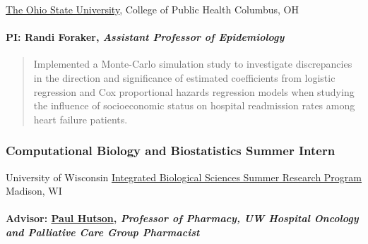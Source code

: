 \documentclass[
  fleqn, oneside]{article}
\begin{document}
\href{https://stat.osu.edu}{The Ohio State University}, College of
Public Health \newline Columbus, OH

\hypertarget{pi-randi-foraker-assistant-professor-of-epidemiology}{%
\paragraph{\texorpdfstring{PI: Randi Foraker, \emph{Assistant Professor
of
Epidemiology}}{PI: Randi Foraker, Assistant Professor of Epidemiology}}\label{pi-randi-foraker-assistant-professor-of-epidemiology}}

\begin{quote}
Implemented a Monte-Carlo simulation study to investigate discrepancies
in the direction and significance of estimated coefficients from
logistic regression and Cox proportional hazards regression models when
studying the influence of socioeconomic status on hospital readmission
rates among heart failure patients.
\end{quote}

\hypertarget{computational-biology-and-biostatistics-summer-intern-2009}{%
\subsubsection{\texorpdfstring{Computational Biology and Biostatistics
Summer Intern
\hfill{}}{Computational Biology and Biostatistics Summer Intern 2009}}\label{computational-biology-and-biostatistics-summer-intern-2009}}

University of Wisconsin
\href{https//www.biostat.wisc.edu/content/computational-biology-and-biostatistics-summer-research-program-cbb}{Integrated
Biological Sciences Summer Research Program} \newline Madison, WI

\hypertarget{advisor-paul-hutson-professor-of-pharmacy-uw-hospital-oncology-and-palliative-care-group-pharmacist}{%
\paragraph{\texorpdfstring{Advisor:
\href{https//apps.pharmacy.wisc.edu/sopdir/paul_hutson/}{Paul Hutson},
\emph{Professor of Pharmacy, UW Hospital Oncology and Palliative Care
Group
Pharmacist}}{Advisor: Paul Hutson, Professor of Pharmacy, UW Hospital Oncology and Palliative Care Group Pharmacist}}\label{advisor-paul-hutson-professor-of-pharmacy-uw-hospital-oncology-and-palliative-care-group-pharmacist}}
\end{document}
